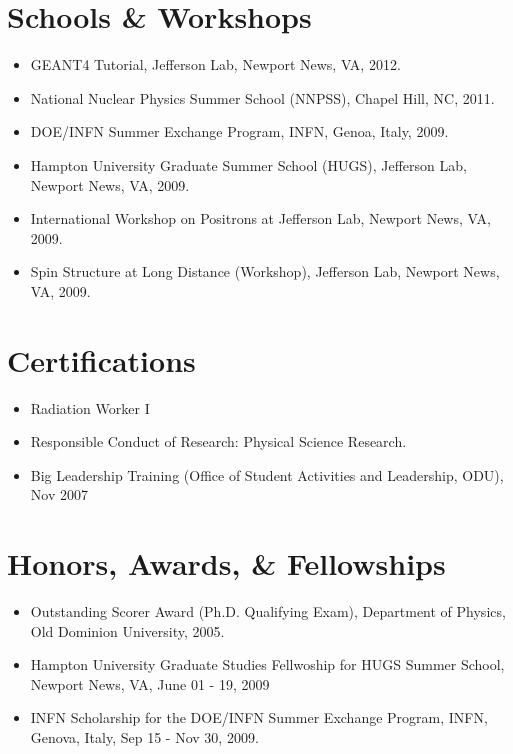 \documentclass[10pt, letterpaper]{article}
\newcommand{\years}[1]{\marginnote{\small #1}} %
\begin{document}
\section*{Schools \& Workshops}
\noindent
\begin{itemize}
\item GEANT4 Tutorial, Jefferson Lab, Newport News, VA, 2012.
\item National Nuclear Physics Summer School (NNPSS), Chapel Hill, NC, 2011.
\item DOE/INFN Summer Exchange Program, INFN, Genoa, Italy, 2009.
\item Hampton University Graduate Summer School (HUGS), Jefferson Lab, Newport News, VA, 2009.
\item International Workshop on Positrons at Jefferson Lab, Newport News, VA, 2009. %
\item Spin Structure at Long Distance (Workshop), Jefferson Lab, Newport News, VA, 2009.
\end{itemize}



\section*{Certifications}
\noindent
\begin{itemize}
\item Radiation Worker I
\item Responsible Conduct of Research: Physical Science Research.
\item Big Leadership Training (Office of Student Activities and Leadership, ODU), Nov 2007
\end{itemize}




\section*{Honors, Awards, \& Fellowships}
\noindent
\begin{itemize}
\item Outstanding Scorer Award (Ph.D. Qualifying Exam), Department of Physics, Old Dominion University, 2005.
\item Hampton University Graduate Studies Fellwoship for HUGS Summer School, Newport News, VA, June 01 - 19, 2009
\item INFN Scholarship for the DOE/INFN Summer Exchange Program, INFN, Genova, Italy, Sep 15 - Nov 30, 2009.
\end{itemize}
\end{document}

